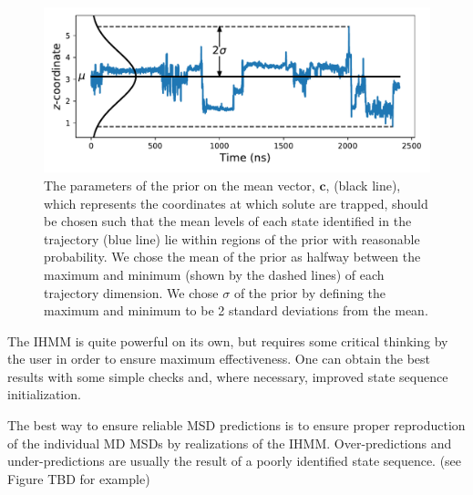 \documentclass{article}
\begin{document}
  \begin{figure}[h]
  \centering
  \includegraphics[width=\textwidth]{prior_guesses.pdf}
  \caption{The parameters of the prior on the mean vector, $\mathbf{c}$, (black line), which
  represents the coordinates at which solute are trapped, should be chosen such
  that the mean levels of each state identified in the trajectory (blue line) lie within
  regions of the prior with reasonable probability. We chose the mean of the prior 
  as halfway between the maximum and minimum (shown by the dashed lines) of each trajectory dimension. We chose 
  $\sigma$ of the prior by defining the maximum and minimum to be 2 standard deviations
  from the mean.}\label{fig:prior_guesses}
  \end{figure}
  
  \pagebreak
  
  The IHMM is quite powerful on its own, but requires some critical thinking by
  the user in order to ensure maximum effectiveness. One can obtain 
  the best results with some simple checks and, where necessary, improved 
  state sequence initialization.
  
  The best way to ensure reliable MSD predictions is to ensure proper reproduction
  of the individual MD MSDs by realizations of the IHMM. Over-predictions and 
  under-predictions are usually the result of a poorly identified state sequence. (see
  Figure TBD for example)
  
\end{document}
